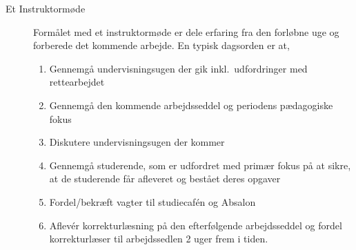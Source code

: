 \documentclass[a4paper]{article}
\begin{document}
\begin{description}
\item[Et Instruktormøde] Formålet med et instruktormøde er dele
  erfaring fra den forløbne uge og forberede det kommende
  arbejde. En typisk dagsorden er at,
  \begin{enumerate}
  \item Gennemgå undervisningsugen der gik inkl.\ udfordringer med rettearbejdet
  \item Gennemgå den kommende arbejdsseddel og periodens pædagogiske
    fokus
  \item Diskutere undervisningsugen der kommer
  \item Gennemgå studerende, som er udfordret med primær fokus på at
    sikre, at de studerende får afleveret og bestået deres opgaver
  \item Fordel/bekræft vagter til studiecaf{\'e}n og Absalon
  \item Aflev{\'e}r korrekturlæsning på den efterfølgende
    arbejdsseddel og fordel korrekturlæser til arbejdssedlen 2 uger
    frem i tiden.
  \end{enumerate}
\end{description}
\end{document}
